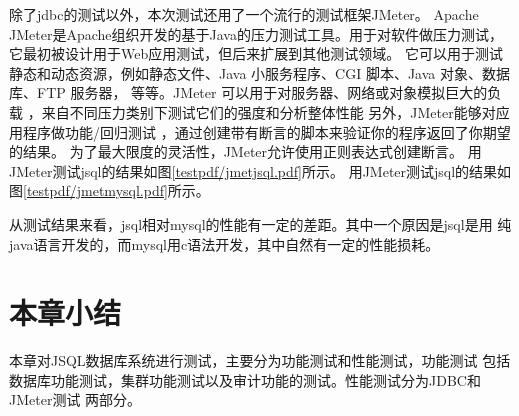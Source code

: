 除了jdbc的测试以外，本次测试还用了一个流行的测试框架JMeter。
Apache JMeter是Apache组织开发的基于Java的压力测试工具。用于对软件做压力测试，
它最初被设计用于Web应用测试，但后来扩展到其他测试领域。
 它可以用于测试静态和动态资源，例如静态文件、Java
  小服务程序、CGI 脚本、Java 对象、数据库、FTP 服务器，
   等等。JMeter 可以用于对服务器、网络或对象模拟巨大的负载
   ，来自不同压力类别下测试它们的强度和分析整体性能
   另外，JMeter能够对应用程序做功能/回归测试
   ，通过创建带有断言的脚本来验证你的程序返回了你期望的结果。
   为了最大限度的灵活性，JMeter允许使用正则表达式创建断言。
   用JMeter测试jsql的结果如图\ref{testpdf/jmetjsql.pdf}所示。
    用JMeter测试jsql的结果如图\ref{testpdf/jmetmysql.pdf}所示。
   
   从测试结果来看，jsql相对mysql的性能有一定的差距。其中一个原因是jsql是用
   纯java语言开发的，而mysql用c语法开发，其中自然有一定的性能损耗。
\section{本章小结}
本章对JSQL数据库系统进行测试，主要分为功能测试和性能测试，功能测试
包括数据库功能测试，集群功能测试以及审计功能的测试。性能测试分为JDBC和JMeter测试
两部分。